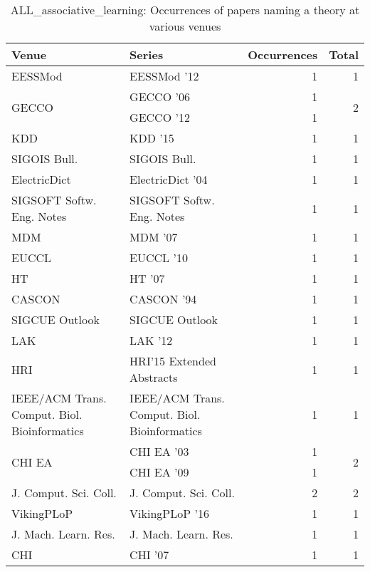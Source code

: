 \begin{table*}[t]
\begin{tabular}{llrr}
Venue & Series & Occurrences & Total\\\hline
\multirow{1}{*}{EESSMod } & EESSMod '12 & 1 & \multirow{1}{*}{1}\\
\multirow{2}{*}{GECCO } & GECCO '06 & 1 & \multirow{2}{*}{2}\\
& GECCO '12 & 1 &\\
\multirow{1}{*}{KDD } & KDD '15 & 1 & \multirow{1}{*}{1}\\
\multirow{1}{*}{SIGOIS Bull.} & SIGOIS Bull. & 1 & \multirow{1}{*}{1}\\
\multirow{1}{*}{ElectricDict } & ElectricDict '04 & 1 & \multirow{1}{*}{1}\\
\multirow{1}{*}{SIGSOFT Softw. Eng. Notes} & SIGSOFT Softw. Eng. Notes & 1 & \multirow{1}{*}{1}\\
\multirow{1}{*}{MDM } & MDM '07 & 1 & \multirow{1}{*}{1}\\
\multirow{1}{*}{EUCCL } & EUCCL '10 & 1 & \multirow{1}{*}{1}\\
\multirow{1}{*}{HT } & HT '07 & 1 & \multirow{1}{*}{1}\\
\multirow{1}{*}{CASCON } & CASCON '94 & 1 & \multirow{1}{*}{1}\\
\multirow{1}{*}{SIGCUE Outlook} & SIGCUE Outlook & 1 & \multirow{1}{*}{1}\\
\multirow{1}{*}{LAK } & LAK '12 & 1 & \multirow{1}{*}{1}\\
\multirow{1}{*}{HRI} & HRI'15 Extended Abstracts & 1 & \multirow{1}{*}{1}\\
\multirow{1}{*}{IEEE/ACM Trans. Comput. Biol. Bioinformatics} & IEEE/ACM Trans. Comput. Biol. Bioinformatics & 1 & \multirow{1}{*}{1}\\
\multirow{2}{*}{CHI EA } & CHI EA '03 & 1 & \multirow{2}{*}{2}\\
& CHI EA '09 & 1 &\\
\multirow{1}{*}{J. Comput. Sci. Coll.} & J. Comput. Sci. Coll. & 2 & \multirow{1}{*}{2}\\
\multirow{1}{*}{VikingPLoP } & VikingPLoP '16 & 1 & \multirow{1}{*}{1}\\
\multirow{1}{*}{J. Mach. Learn. Res.} & J. Mach. Learn. Res. & 1 & \multirow{1}{*}{1}\\
\multirow{1}{*}{CHI } & CHI '07 & 1 & \multirow{1}{*}{1}\\
\end{tabular}
\caption{ALL\_associative\_learning: Occurrences of papers naming a theory at various venues}
\end{table*}